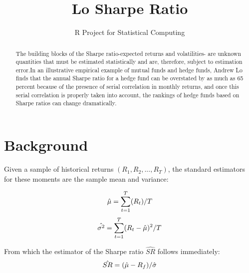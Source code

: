 \documentclass[12pt,letterpaper,english]{article}
\title{Lo Sharpe Ratio}
\author{R Project for Statistical Computing}
\begin{document}


\maketitle


\begin{abstract}
The building blocks of the Sharpe ratio-expected returns and volatilities-
are unknown quantities that must be estimated statistically and are,
therefore, subject to estimation error.In an illustrative
empirical example of mutual funds and hedge funds, Andrew Lo finds that the annual Sharpe ratio for a hedge fund can be overstated by as much as 65 percent
because of the presence of serial correlation in monthly returns, and once
this serial correlation is properly taken into account, the rankings of hedge
funds based on Sharpe ratios can change dramatically.
\end{abstract}



\section{Background}
Given a sample of historical returns \((R_1,R_2, . . .,R_T)\), the standard estimators for these moments are the sample mean and variance:

  
\begin{equation}
 \hat{\mu}  =  \sum_{t=1}^{T} (R_t)/T\\
\end{equation}
\begin{equation}
\hat{\sigma^2}  =  \sum_{t=1}^{T} (R_t-\hat{\mu})^2/T\\
\end{equation}

From which the estimator of the Sharpe ratio $\hat{SR}$ follows immediately:
\begin{equation}
\hat{SR}  =  (\hat{\mu}- R_f)/\hat{\sigma} \\
\end{equation}
\end{document}

